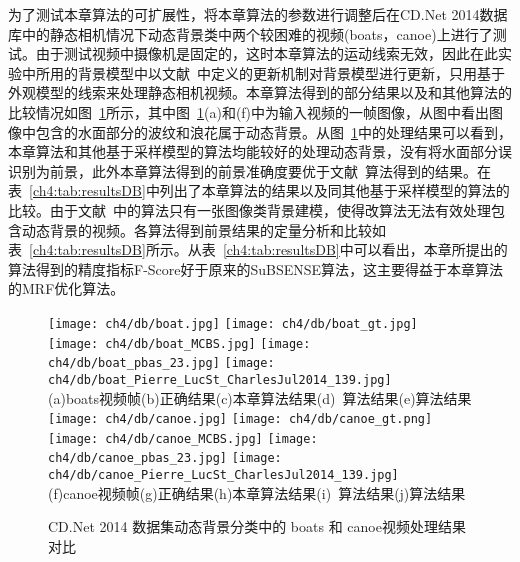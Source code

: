 为了测试本章算法的可扩展性，将本章算法的参数进行调整后在CD.Net 2014数据库中的静态相机情况下动态背景类中两个较困难的视频(boats，canoe)上进行了测试。由于测试视频中摄像机是固定的，这时本章算法的运动线索无效，因此在此实验中所用的背景模型中以文献~中定义的更新机制对背景模型进行更新，只用基于外观模型的线索来处理静态相机视频。本章算法得到的部分结果以及和其他算法的比较情况如图~\ref{ch4:fig:dbresults}所示，其中图~\ref{ch4:fig:dbresults}(a)和(f)中为输入视频的一帧图像，从图中看出图像中包含的水面部分的波纹和浪花属于动态背景。从图~\ref{ch4:fig:dbresults}中的处理结果可以看到，本章算法和其他基于采样模型的算法\cite{pbas,subsenseTIP}均能较好的处理动态背景，没有将水面部分误识别为前景，此外本章算法得到的前景准确度要优于文献~算法得到的结果。在表~\ref{ch4:tab:resultsDB}中列出了本章算法的结果以及同其他基于采样模型的算法的比较。由于文献~中的算法只有一张图像类背景建模，使得改算法无法有效处理包含动态背景的视频。各算法得到前景结果的定量分析和比较如表~\ref{ch4:tab:resultsDB}所示。从表~\ref{ch4:tab:resultsDB}中可以看出，本章所提出的算法得到的精度指标F-Score好于原来的SuBSENSE算法\cite{subsenseTIP}，这主要得益于本章算法的MRF优化算法。
\begin{figure}
  \centering
  \texttt{[image: ch4/db/boat.jpg]}
  \texttt{[image: ch4/db/boat\_gt.jpg]}
  \texttt{[image: ch4/db/boat\_MCBS.jpg]}
  \texttt{[image: ch4/db/boat\_pbas\_23.jpg]}
  \texttt{[image: ch4/db/boat\_Pierre\_LucSt\_CharlesJul2014\_139.jpg]}\\
  (a)boats视频帧(b)正确结果(c)本章算法结果(d)~算法结果(e)算法结果 \\
  \texttt{[image: ch4/db/canoe.jpg]}
  \texttt{[image: ch4/db/canoe\_gt.png]}
  \texttt{[image: ch4/db/canoe\_MCBS.jpg]}
  \texttt{[image: ch4/db/canoe\_pbas\_23.jpg]}
  \texttt{[image: ch4/db/canoe\_Pierre\_LucSt\_CharlesJul2014\_139.jpg]}\\
  (f)canoe视频帧(g)正确结果(h)本章算法结果(i)~算法结果(j)算法结果 \\
  \caption{CD.Net 2014 数据集动态背景分类中的 boats 和 canoe视频处理结果对比}\label{ch4:fig:dbresults}
\end{figure}


